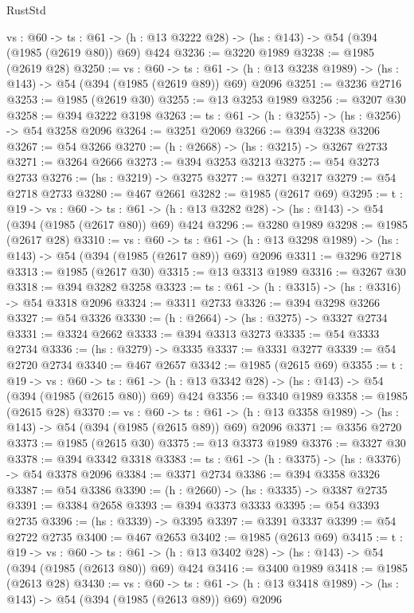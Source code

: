 \begin{lexlean}{RustStd}
\begin{coremodule}
{\begin{coremodule}
{{{{{{{{  {vs : @60} ->
  {ts : @61} -> (h : @13 @3222 @28) -> (hs : @143) -> @54 (@394 (@1985 (@2619 @80)) @69) @424
@3236 := @3220 @1989
@3238 := @1985 (@2619 @28)
@3250 := {vs : @60} ->
  {ts : @61} -> (h : @13 @3238 @1989) -> (hs : @143) -> @54 (@394 (@1985 (@2619 @89)) @69) @2096
@3251 := @3236 @2716
@3253 := @1985 (@2619 @30)
@3255 := @13 @3253 @1989
@3256 := @3207 @30
@3258 := @394 @3222 @3198
@3263 := {ts : @61} -> (h : @3255) -> (hs : @3256) -> @54 @3258 @2096
@3264 := @3251 @2069
@3266 := @394 @3238 @3206
@3267 := @54 @3266
@3270 := (h : @2668) -> (hs : @3215) -> @3267 @2733
@3271 := @3264 @2666
@3273 := @394 @3253 @3213
@3275 := @54 @3273 @2733
@3276 := (hs : @3219) -> @3275
@3277 := @3271 @3217
@3279 := @54 @2718 @2733
@3280 := @467 @2661
@3282 := @1985 (@2617 @69)
@3295 := {t : @19} ->
  {vs : @60} ->
  {ts : @61} -> (h : @13 @3282 @28) -> (hs : @143) -> @54 (@394 (@1985 (@2617 @80)) @69) @424
@3296 := @3280 @1989
@3298 := @1985 (@2617 @28)
@3310 := {vs : @60} ->
  {ts : @61} -> (h : @13 @3298 @1989) -> (hs : @143) -> @54 (@394 (@1985 (@2617 @89)) @69) @2096
@3311 := @3296 @2718
@3313 := @1985 (@2617 @30)
@3315 := @13 @3313 @1989
@3316 := @3267 @30
@3318 := @394 @3282 @3258
@3323 := {ts : @61} -> (h : @3315) -> (hs : @3316) -> @54 @3318 @2096
@3324 := @3311 @2733
@3326 := @394 @3298 @3266
@3327 := @54 @3326
@3330 := (h : @2664) -> (hs : @3275) -> @3327 @2734
@3331 := @3324 @2662
@3333 := @394 @3313 @3273
@3335 := @54 @3333 @2734
@3336 := (hs : @3279) -> @3335
@3337 := @3331 @3277
@3339 := @54 @2720 @2734
@3340 := @467 @2657
@3342 := @1985 (@2615 @69)
@3355 := {t : @19} ->
  {vs : @60} ->
  {ts : @61} -> (h : @13 @3342 @28) -> (hs : @143) -> @54 (@394 (@1985 (@2615 @80)) @69) @424
@3356 := @3340 @1989
@3358 := @1985 (@2615 @28)
@3370 := {vs : @60} ->
  {ts : @61} -> (h : @13 @3358 @1989) -> (hs : @143) -> @54 (@394 (@1985 (@2615 @89)) @69) @2096
@3371 := @3356 @2720
@3373 := @1985 (@2615 @30)
@3375 := @13 @3373 @1989
@3376 := @3327 @30
@3378 := @394 @3342 @3318
@3383 := {ts : @61} -> (h : @3375) -> (hs : @3376) -> @54 @3378 @2096
@3384 := @3371 @2734
@3386 := @394 @3358 @3326
@3387 := @54 @3386
@3390 := (h : @2660) -> (hs : @3335) -> @3387 @2735
@3391 := @3384 @2658
@3393 := @394 @3373 @3333
@3395 := @54 @3393 @2735
@3396 := (hs : @3339) -> @3395
@3397 := @3391 @3337
@3399 := @54 @2722 @2735
@3400 := @467 @2653
@3402 := @1985 (@2613 @69)
@3415 := {t : @19} ->
  {vs : @60} ->
  {ts : @61} -> (h : @13 @3402 @28) -> (hs : @143) -> @54 (@394 (@1985 (@2613 @80)) @69) @424
@3416 := @3400 @1989
@3418 := @1985 (@2613 @28)
@3430 := {vs : @60} ->
  {ts : @61} -> (h : @13 @3418 @1989) -> (hs : @143) -> @54 (@394 (@1985 (@2613 @89)) @69) @2096
}}}}}}}}
\end{coremodule}}
\end{coremodule}
\end{lexlean}
